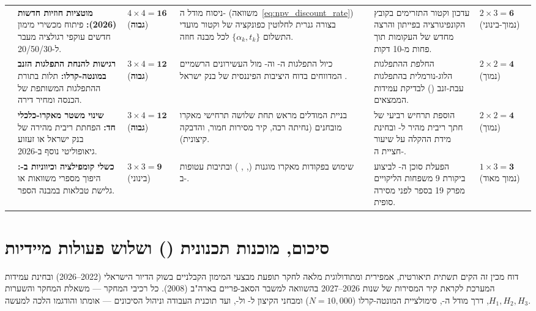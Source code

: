 \begin{table}[htbp]
\begin{tabularx}{\textwidth}{R{1.2cm} R{2.4cm} C{1.6cm} Y Y C{1.5cm}}
\textbf{} & \textbf{מוטציות חוזיות חדשות (\num{2026}):} פיתוח מכשירי מימון חדשים עוקפי רגולציה מעבר ל-\num{20/50/30}. & $4 \times 4 = \mathbf{16}$ (\textbf{\color{BrandRed}גבוה}) & ניסוח מודל ה- (משוואה~\ref{eq:npv_discount_rate}) בצורה גנרית לחלוטין כפונקציה של וקטור מועדי התשלום $\{\alpha_k, t_k\}$ לכל מבנה חוזה. & עדכון וקטור התזרימים בקובץ הקונפיגורציה בפייתון והרצה מחדש של העקומות תוך פחות מ-\num{10} דקות. & $2 \times 3 = \mathbf{6}$ (\color{BrandTeal}נמוך-בינוני) \\
\textbf{} & \textbf{רגישות להנחת התפלגות הזנב במונטה-קרלו:} תלות בתורת ההתפלגות המשותפת של הכנסה ומחיר דירה. & $3 \times 4 = \mathbf{12}$ (\textbf{\color{BrandRed}גבוה}) & כיול התפלגות ה- וה- מול העשירונים הרשמיים המדווחים בדוח היציבות הפיננסית של בנק ישראל \cite{boi2025stability}. & החלפת ההתפלגות הלוג-נורמלית בהתפלגות  עבת-זנב () לבדיקת עמידות הממצאים. & $2 \times 2 = \mathbf{4}$ (\color{BrandTeal}נמוך) \\
\textbf{} & \textbf{שינוי משטר מאקרו-כלכלי חד:} הפחתת ריבית מהירה של בנק ישראל או זעזוע גיאופוליטי נוסף ב-\num{2026}. & $3 \times 4 = \mathbf{12}$ (\textbf{\color{BrandRed}גבוה}) & בניית המודלים מראש תחת שלושה תרחישי מאקרו מובחנים (נחיתה רכה, קיר מסירות חמור, והדבקה קיצונית). & הוספת תרחיש רביעי של חתך ריבית מהיר ל- ובחינת מידת ההקלה על שיעור חציית ה-. & $2 \times 2 = \mathbf{4}$ (\color{BrandTeal}נמוך) \\
\textbf{} & \textbf{כשלי קומפילציה וכיווניות  ב-\en{\LaTeX}:} היפוך מספרי משוואות או גלישת טבלאות במבנה הספר. & $3 \times 3 = \mathbf{9}$ (\color{BrandGold}בינוני) & שימוש בפקודות מאקרו מוגנות (, , ) ובתיבות עטופות  ב-. & הפעלת סוכן ה- לביצוע ביקורת \num{9} משפחות הליקויים מפרק \num{19} בספר לפני מסירה סופית. & $1 \times 3 = \mathbf{3}$ (\color{BrandTeal}נמוך מאוד) \\
\bottomrule
\end{tabularx}
\end{table}

\section{סיכום, מוכנות תכנונית () ושלוש פעולות מיידיות}
\label{sec:design_readiness}

דוח מכין זה הקים תשתית תיאורטית, אמפירית ומתודולוגית מלאה לחקר תופעת מבצעי המימון הקבלניים בשוק הדיור הישראלי (\num{2022}--\num{2026}) ובחינת עמידות המערכת לקראת קיר המסירות של שנות \num{2026}--\num{2027} בהשוואה למשבר הסאב-פריים בארה"ב (\num{2008}). כל רכיבי המחקר — משאלת המחקר והשערות $H_1, H_2, H_3$, דרך מודל ה-, סימולציית המונטה-קרלו ($N=10,000$) ומבחני הקיצון ל- ול-, ועד תוכנית העבודה וניהול הסיכונים — אומתו והודגמו הלכה למעשה.

